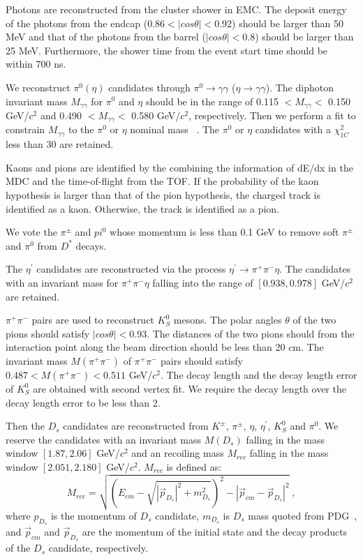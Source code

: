 \documentclass[aps,prd,twocolumn,showpacs,amsmath,amssymb]{revtex4-1}
\begin{document}
Photons are reconstructed from the cluster shower in EMC.
The deposit energy of the photons from the endcap ($0.86 < |cos\theta| < 0.92$) should be larger than 50 MeV and that of the photons from the barrel ($|cos\theta| < 0.8$) should be larger than 25 MeV.
Furthermore, the shower time from the event start time should be within 700 ns.

We reconstruct $\pi^{0} (\eta)$ candidates through $\pi^{0} \rightarrow \gamma\gamma$ ($\eta \rightarrow \gamma\gamma$).
The diphoton invariant mass $M_{\gamma\gamma}$ for $\pi^{0}$ and $\eta$ should be in the range of 0.115 $< M_{\gamma\gamma} <$ 0.150 GeV/$c^{2}$ and 0.490 $< M_{\gamma\gamma} <$ 0.580 GeV/$c^{2}$, respectively.
Then we perform a fit to constrain $M_{\gamma\gamma}$ to the $\pi^{0}$ or $\eta$ nominal mass ~\cite{PDG}.
The $\pi^{0}$ or $\eta$ candidates with a $\chi^{2}_{1C}$ less than 30 are retained.

Kaons and pions are identified by the combining the information of dE/dx in the MDC and the time-of-flight from the TOF.
If the probability of the kaon hypothesis is larger than that of the pion hypothesis, the charged track is identified as a kaon.
Otherwise, the track is identified as a pion.

We vote the $\pi^{\pm}$ and $pi^{0}$ whose momentum is less than 0.1 GeV to remove soft $\pi^{\pm}$ and $\pi^{0}$ from $D^{*}$ decays.

The $\eta^{'}$ candidates are reconstructed via the process $\eta^{'} \rightarrow \pi^{+}\pi^{-}\eta$.
The candidates with an invariant mass for $\pi^{+}\pi^{-}\eta$ falling into the range of $[0.938, 0.978]$ GeV/$c^{2}$ are retained.

$\pi^{+}\pi^{-}$ pairs are used to reconstruct $K_{S}^{0}$ mesons.
The polar angles $\theta$ of the two pions should satisfy $|cos\theta| < 0.93$.
The distances of the two pions should from the interaction point along the beam direction should be less than 20 cm. 
The invariant mass $M(\pi^{+}\pi^{-})$ of $\pi^{+}\pi^{-}$ pairs  should satisfy $0.487 < M(\pi^{+}\pi^{-}) < 0.511$ GeV/$c^{2}$.
The decay length and the decay length error of $K_{S}^{0}$ are obtained with second vertex fit.
We require the decay length over the decay length error to be less than 2.

Then the $D_{s}$ candidates are reconstructed from $K^{\pm}$, $\pi^{\pm}$, $\eta$, $\eta^{'}$, $K_{S}^{0}$ and $\pi^{0}$.
We reserve the candidates with an invariant mass $M(D_{s})$ falling in the mass window $[1.87, 2.06]$ GeV/$c^{2}$ and an recoiling mass $M_{rec}$ falling in the mass window $[2.051, 2.180]$ GeV/$c^{2}$.
$M_{rec}$ is defined as:
\begin{equation}
    M_{rec} = \sqrt{(E_{cm} - \sqrt{| \vec p_{D_{s}} |^{2} + m_{D_{s}}^{2}})^{2} - |\vec p_{cm} - \vec p_{D_{s}} | ^{2}} \; , \label{con:inventoryflow}
\end{equation}
where $p_{D_{s}}$ is the momentum of $D_{s}$ candidate, $m_{D_{s}}$ is $D_{s}$ mass quoted from PDG~\cite{PDG},
and $\vec p_{cm}$ and $\vec p_{D_{s}}$ are the momentum of the initial state and the decay products of the $D_{s}$ candidate, respectively. 
\end{document}
